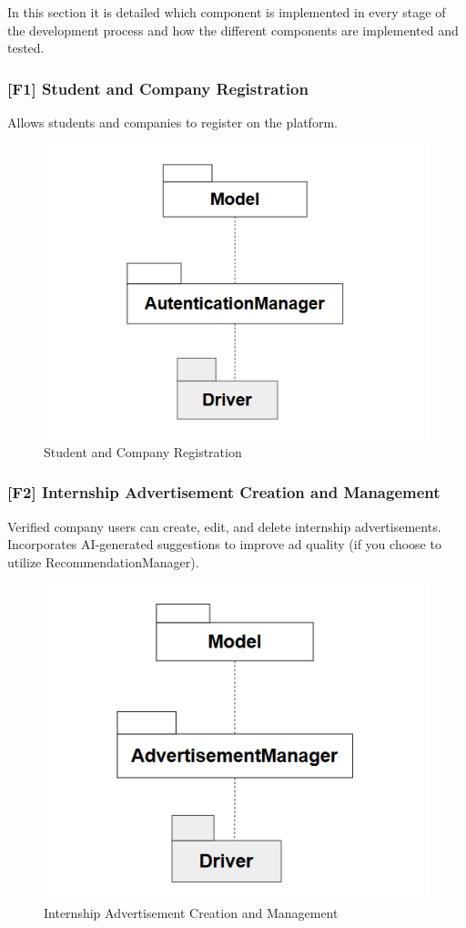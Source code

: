 In this section it is detailed which component is implemented in every stage of the
development process and how the different components are implemented and tested.

\subsubsection*{[F1] Student and Company Registration}
Allows students and companies to register on the platform.

\begin{figure}[h]
    \centering
    \includegraphics[width=0.5\linewidth]{DD-Latex//assets//Component Integration Graphs/component1.png}
    \caption{Student and Company Registration}
\end{figure}

\subsubsection*{[F2] Internship Advertisement Creation and Management}
Verified company users can create, edit, and delete internship advertisements.
Incorporates AI-generated suggestions to improve ad quality (if you choose to utilize RecommendationManager).

\begin{figure}[h]
    \centering
    \includegraphics[width=0.5\linewidth]{DD-Latex//assets//Component Integration Graphs/component2.png}
    \caption{Internship Advertisement Creation and Management}
\end{figure}

